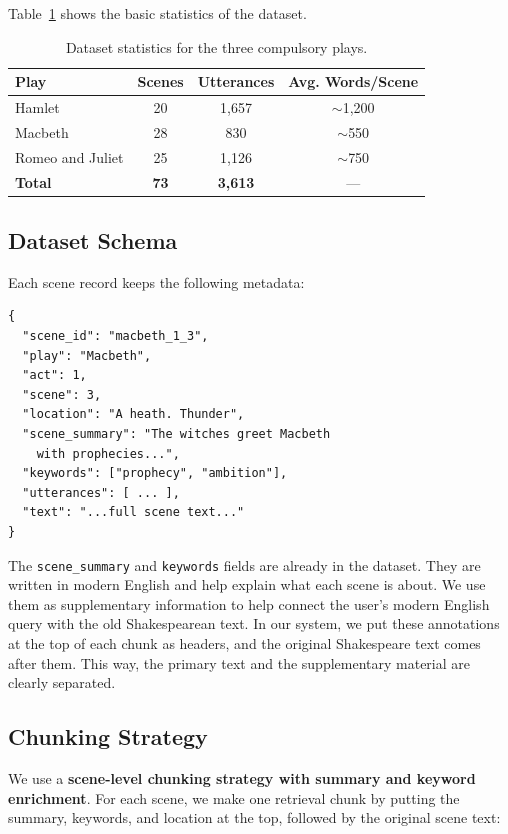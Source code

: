 \documentclass[10pt,conference]{IEEEtran}
\begin{document}
Table~\ref{tab:dataset-stats} shows the basic statistics of the dataset.

\begin{table}[h]
\centering
\caption{Dataset statistics for the three compulsory plays.}
\label{tab:dataset-stats}
\begin{tabular}{lccc}
\toprule
Play & Scenes & Utterances & Avg. Words/Scene \\
\midrule
Hamlet & 20 & 1,657 & $\sim$1,200 \\
Macbeth & 28 & 830 & $\sim$550 \\
Romeo and Juliet & 25 & 1,126 & $\sim$750 \\
\midrule
\textbf{Total} & \textbf{73} & \textbf{3,613} & --- \\
\bottomrule
\end{tabular}
\end{table}

\subsection{Dataset Schema}

Each scene record keeps the following metadata:

\begin{lstlisting}[language={}]
{
  "scene_id": "macbeth_1_3",
  "play": "Macbeth",
  "act": 1,
  "scene": 3,
  "location": "A heath. Thunder",
  "scene_summary": "The witches greet Macbeth
    with prophecies...",
  "keywords": ["prophecy", "ambition"],
  "utterances": [ ... ],
  "text": "...full scene text..."
}
\end{lstlisting}

The \texttt{scene\_summary} and \texttt{keywords} fields are already in the dataset. They are written in modern English and help explain what each scene is about. We use them as supplementary information to help connect the user's modern English query with the old Shakespearean text. In our system, we put these annotations at the top of each chunk as headers, and the original Shakespeare text comes after them. This way, the primary text and the supplementary material are clearly separated.

\subsection{Chunking Strategy}

We use a \textbf{scene-level chunking strategy with summary and keyword enrichment}. For each scene, we make one retrieval chunk by putting the summary, keywords, and location at the top, followed by the original scene text:
\end{document}
